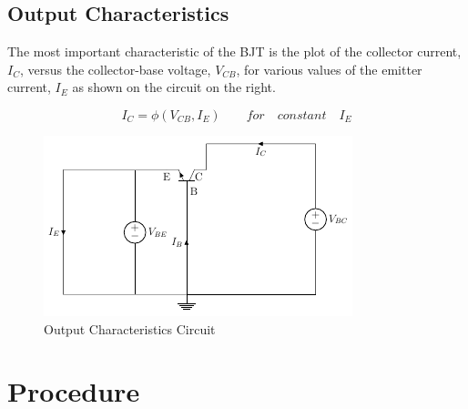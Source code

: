 		\subsection{Output Characteristics}
			The most important characteristic of the BJT is the plot of the collector current, $I_C$, versus the collector-base voltage, $V_{CB}$, for various values of the emitter current, $I_E$ as shown on the circuit on the right.			
			
			$$I_C =\phi(V_{CB} , I_E) \qquad for \quad constant \quad I_E$$
			
			\begin{figure}[h]
				\centering
				\includegraphics[width=0.7\linewidth]{img/exp10/5}
				\caption{Output Characteristics Circuit}
				\label{fig:bjt2_Out_char_circuit}
			\end{figure}
		
	\section{Procedure}
